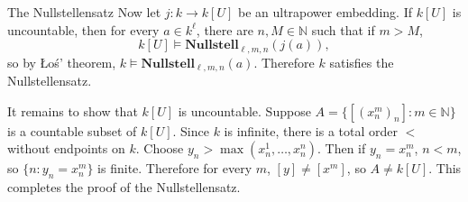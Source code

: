 \documentclass[10pt]{beamer}
\newcommand{\NN}{\mathbb{N}}
\begin{document}
%

\begin{frame}{The Nullstellensatz}
Now let $j: k \to k[U]$ be an ultrapower embedding. \pause
If $k[U]$ is uncountable, then for every $a \in k^\ell$, there are $n, M \in \NN$ such that if $m > M$,
$$k[U] \models \mathbf{Nullstell}_{\ell,m,n}(j(a)),$$
so by Łoś' theorem, $k \models \mathbf{Nullstell}_{\ell,m,n}(a)$.
Therefore $k$ satisfies the Nullstellensatz.

\pause

It remains to show that $k[U]$ is uncountable. Suppose $A = \{[(x_n^m)_n]: m \in \NN\}$ is a countable subset of $k[U]$.
Since $k$ is infinite, there is a total order $<$ without endpoints on $k$.
Choose $y_n > \max(x_n^1, \dots, x_n^n)$.
Then if $y_n = x_n^m$, $n < m$, so $\{n: y_n = x_n^m\}$ is finite. Therefore for every $m$, $[y] \neq [x^m]$, so $A \neq k[U]$. \pause This completes the proof of the Nullstellensatz.
\end{frame}
\end{document}
